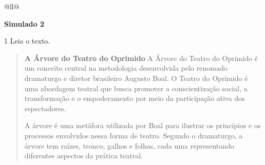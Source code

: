 \begin{itemize}
\begin{itemize}
\begin{escolha}[]{@{}ll@{}}


\textbf{Simulado 2}

\num{1} Leia o texto.

\begin{quote}
\textbf{A Árvore do Teatro do Oprimido}
A Árvore do Teatro do Oprimido é um conceito central na metodologia desenvolvida pelo renomado dramaturgo e 
diretor brasileiro Augusto Boal. O Teatro do Oprimido é uma abordagem teatral que busca promover a 
conscientização social, a transformação e o empoderamento por meio da participação ativa dos espectadores.

A árvore é uma metáfora utilizada por Boal para ilustrar os princípios e os processos envolvidos nessa 
forma de teatro. Segundo o dramaturgo, a árvore tem raízes, tronco, galhos e folhas, cada uma representando diferentes aspectos da prática teatral.


\end{quote}
\end{escolha}
\end{itemize}
\end{itemize}
